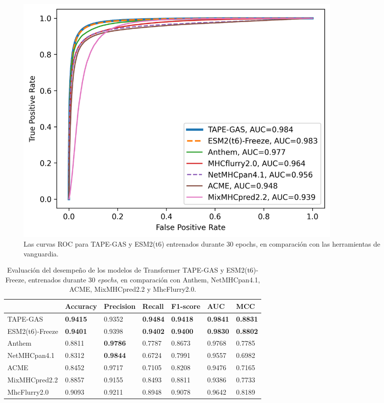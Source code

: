 \begin{figure}
	\centering
	\includegraphics[width=0.8\textwidth]{img/results/ROC_comparison}
	\caption[Comparación de ROC con métodos del estado del arte]{Las curvas ROC para TAPE-GAS y ESM2(t6) entrenados durante 30 epochs, en comparación con las herramientas de vanguardia.}
	\label{fig:ROC_comparison_final}
\end{figure}

\begin{table}[]
	\centering
	\caption{Evaluación del desempeño de los modelos de Transformer TAPE-GAS y ESM2(t6)-Freeze, entrenados durante 30 \textit{epochs}, en comparación con Anthem, NetMHCpan4.1, ACME, MixMHCpred2.2 y MhcFlurry2.0.}
	\label{tab:final_comparison}
	\setlength{\tabcolsep}{0.5em} %
	{\renewcommand{\arraystretch}{1.5}%
	\begin{tabular}{lllllll}
		& \textbf{Accuracy} & \textbf{Precision} & \textbf{Recall} & \textbf{F1-score} & \textbf{AUC}    & \textbf{MCC}    \\ \midrule
		TAPE-GAS        & \textbf{0.9415}   & 0.9352             & \textbf{0.9484} & \textbf{0.9418}   & \textbf{0.9841} & \textbf{0.8831} \\
		ESM2(t6)-Freeze & \textbf{0.9401}   & 0.9398             & \textbf{0.9402} & \textbf{0.9400}   & \textbf{0.9830} & \textbf{0.8802} \\
		
		Anthem          & 0.8811            & \textbf{0.9786}    & 0.7787          & 0.8673            & 0.9768          & 0.7785          \\
		NetMHCpan4.1    & 0.8312            & \textbf{0.9844}    & 0.6724          & 0.7991            & 0.9557          & 0.6982          \\
		
		ACME            & 0.8452            & 0.9717             & 0.7105          & 0.8208            & 0.9476          & 0.7165          \\
		MixMHCpred2.2   & 0.8857            & 0.9155             & 0.8493          & 0.8811            & 0.9386          & 0.7733          \\
		MhcFlurry2.0    & 0.9093            & 0.9211             & 0.8948          & 0.9078            & 0.9642          & 0.8189 \\         
	\end{tabular}}
\end{table}

